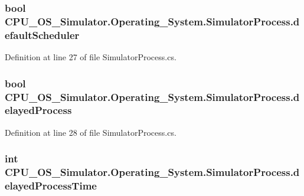 \subsubsection[{default\+Scheduler}]{\setlength{\rightskip}{0pt plus 5cm}bool C\+P\+U\+\_\+\+O\+S\+\_\+\+Simulator.\+Operating\+\_\+\+System.\+Simulator\+Process.\+default\+Scheduler\hspace{0.3cm}{\ttfamily [private]}}\label{class_c_p_u___o_s___simulator_1_1_operating___system_1_1_simulator_process_ab52228f4f5902049430dc58c0c7408c3}


Definition at line 27 of file Simulator\+Process.\+cs.

\hypertarget{class_c_p_u___o_s___simulator_1_1_operating___system_1_1_simulator_process_a1f62a5a6071d0525b8dea84e9205a591}{}
\subsubsection[{delayed\+Process}]{\setlength{\rightskip}{0pt plus 5cm}bool C\+P\+U\+\_\+\+O\+S\+\_\+\+Simulator.\+Operating\+\_\+\+System.\+Simulator\+Process.\+delayed\+Process\hspace{0.3cm}{\ttfamily [private]}}\label{class_c_p_u___o_s___simulator_1_1_operating___system_1_1_simulator_process_a1f62a5a6071d0525b8dea84e9205a591}


Definition at line 28 of file Simulator\+Process.\+cs.

\hypertarget{class_c_p_u___o_s___simulator_1_1_operating___system_1_1_simulator_process_a17a480e988d10e48af5478b5ebe0794d}{}
\subsubsection[{delayed\+Process\+Time}]{\setlength{\rightskip}{0pt plus 5cm}int C\+P\+U\+\_\+\+O\+S\+\_\+\+Simulator.\+Operating\+\_\+\+System.\+Simulator\+Process.\+delayed\+Process\+Time\hspace{0.3cm}{\ttfamily [private]}}\label{class_c_p_u___o_s___simulator_1_1_operating___system_1_1_simulator_process_a17a480e988d10e48af5478b5ebe0794d}


